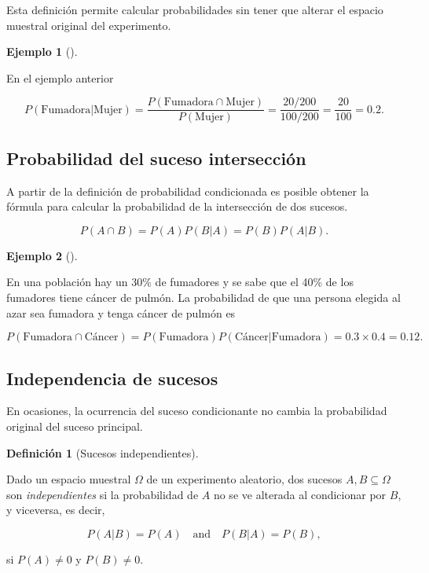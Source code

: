 \documentclass[
  a4paper,
]{scrreport}
\theoremstyle{plain}
\theoremstyle{definition}
\newtheorem{example}{Ejemplo}[chapter]
\theoremstyle{definition}
\newtheorem{definition}{Definición}[chapter]
\theoremstyle{remark}
\begin{document}
Esta definición permite calcular probabilidades sin tener que alterar el
espacio muestral original del experimento.

\begin{example}[]\protect\hypertarget{exm-probabilidad-condicionada}{}\label{exm-probabilidad-condicionada}

En el ejemplo anterior

\[P(\mbox{Fumadora}|\mbox{Mujer})= \frac{P(\mbox{Fumadora}\cap \mbox{Mujer})}{P(\mbox{Mujer})} =  \frac{20/200}{100/200}=\frac{20}{100}=0.2.\]

\end{example}

\subsection{Probabilidad del suceso
intersección}\label{probabilidad-del-suceso-intersecciuxf3n}

A partir de la definición de probabilidad condicionada es posible
obtener la fórmula para calcular la probabilidad de la intersección de
dos sucesos.

\[P(A\cap B) = P(A)P(B|A) = P(B)P(A|B).\]

\begin{example}[]\protect\hypertarget{exm-probabilidad-interseccion}{}\label{exm-probabilidad-interseccion}

En una población hay un 30\% de fumadores y se sabe que el 40\% de los
fumadores tiene cáncer de pulmón. La probabilidad de que una persona
elegida al azar sea fumadora y tenga cáncer de pulmón es

\[P(\mbox{Fumadora}\cap \mbox{Cáncer})= P(\mbox{Fumadora})P(\mbox{Cáncer}|\mbox{Fumadora}) = 0.3\times 0.4 = 0.12.\]

\end{example}

\subsection{Independencia de sucesos}\label{independencia-de-sucesos}

En ocasiones, la ocurrencia del suceso condicionante no cambia la
probabilidad original del suceso principal.

\begin{definition}[Sucesos
independientes]\protect\hypertarget{def-sucesos-independientes}{}\label{def-sucesos-independientes}

Dado un espacio muestral \(\Omega\) de un experimento aleatorio, dos
sucesos \(A,B\subseteq \Omega\) son \emph{independientes} si la
probabilidad de \(A\) no se ve alterada al condicionar por \(B\), y
viceversa, es decir,

\[P(A|B) = P(A) \quad \mbox{and} \quad P(B|A)=P(B),\]

si \(P(A)\neq 0\) y \(P(B)\neq 0\).

\end{definition}
\end{document}
